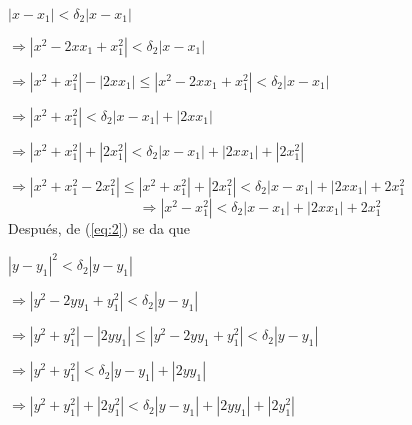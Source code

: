 \documentclass[fleqn]{article}
\begin{document}
\begin{enumerate}
        $ \left\lvert x - x_1 \right\rvert < \delta_2 \left\lvert x - x_1 \right\rvert $

        $ \Longrightarrow \left\lvert x^2 - 2xx_1 + x_1^2 \right\rvert < \delta_2 \left\lvert x - x_1 \right\rvert $

        $ \Longrightarrow \left\lvert x^2 + x_1^2 \right\rvert - \left\lvert 2xx_1 \right\rvert \leq \left\lvert x^2 - 2xx_1 + x_1^2 \right\rvert < \delta_2 \left\lvert x - x_1 \right\rvert $

        $ \Longrightarrow \left\lvert x^2 + x_1^2 \right\rvert < \delta_2 \left\lvert x - x_1 \right\rvert + \left\lvert 2xx_1 \right\rvert $

        $ \Longrightarrow \left\lvert x^2 + x_1^2 \right\rvert + \left\lvert 2x_1^2 \right\rvert < \delta_2 \left\lvert x - x_1 \right\rvert + \left\lvert 2xx_1 \right\rvert + \left\lvert 2x_1^2 \right\rvert $

        $ \Longrightarrow \left\lvert x^2 + x_1^2 - 2x_1^2 \right\rvert \leq \left\lvert x^2 + x_1^2 \right\rvert + \left\lvert 2x_1^2 \right\rvert < \delta_2 \left\lvert x - x_1 \right\rvert + \left\lvert 2xx_1 \right\rvert + 2x_1^2 $
        \begin{equation}
            \Longrightarrow \left\lvert x^2 - x_1^2 \right\rvert < \delta_2 \left\lvert x - x_1 \right\rvert + \left\lvert 2xx_1 \right\rvert + 2x_1^2
            \label{eq:4}
        \end{equation}
        Después, de (\ref{eq:2}) se da que

        $ \left\lvert y - y_1 \right\rvert ^2 < \delta_2 \left\lvert y - y_1 \right\rvert $

        $ \Longrightarrow \left\lvert y^2 - 2yy_1 + y_1^2 \right\rvert < \delta_2 \left\lvert y - y_1 \right\rvert $

        $ \Longrightarrow \left\lvert y^2 + y_1^2 \right\rvert - \left\lvert 2yy_1 \right\rvert \leq \left\lvert y^2 - 2yy_1 + y_1^2 \right\rvert < \delta_2 \left\lvert y - y_1 \right\rvert $

        $ \Longrightarrow \left\lvert y^2 + y_1^2 \right\rvert < \delta_2 \left\lvert y - y_1 \right\rvert + \left\lvert 2yy_1 \right\rvert $

        $ \Longrightarrow \left\lvert y^2 + y_1^2 \right\rvert + \left\lvert 2y_1^2 \right\rvert < \delta_2 \left\lvert y - y_1 \right\rvert + \left\lvert 2yy_1 \right\rvert + \left\lvert 2y_1^2 \right\rvert $


\end{enumerate}
\end{document}
